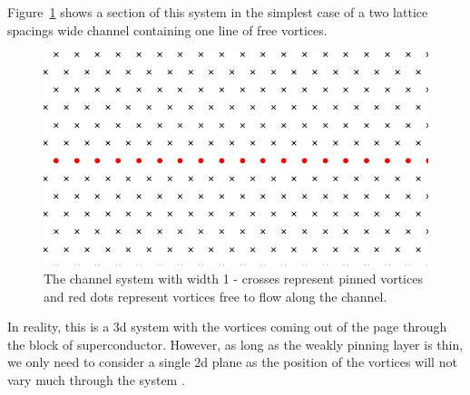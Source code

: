 \documentclass{article}
\numberwithin{equation}{section}
\begin{document}
Figure~\ref{fig:channel_system} shows a section of this system in the simplest case of a two lattice spacings wide channel containing one line of free vortices.
\begin{figure}[htb]
    \centering
    \includegraphics[width=0.8\linewidth]{results/Figures/channel_drawing - cropped.jpg}
    \caption{The channel system with width 1 - crosses represent pinned vortices and red dots represent vortices free to flow along the channel.}
    \label{fig:channel_system}
\end{figure}
In reality, this is a 3d system with the vortices coming out of the page through the block of superconductor. However, as long as the weakly pinning layer is thin, we only need to consider a single 2d plane as the position of the vortices will not vary much through the system \cite{Gartlan2020NovelFibres}.
 
\end{document}
